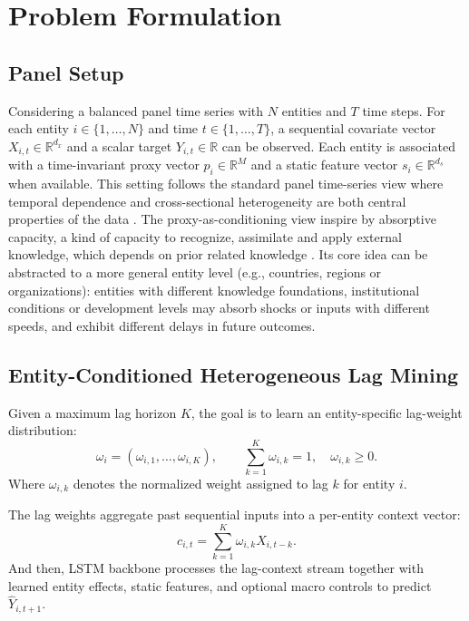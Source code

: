 \documentclass[conference]{IEEEtran}
\begin{document}
\section{Problem Formulation}\label{sec:problem_formulation}
\subsection{Panel Setup}
Considering a balanced panel time series with $N$ entities and $T$ time steps. For each entity $i \in \{1,\ldots,N\}$ and time $t \in \{1,\ldots,T\}$, a sequential covariate vector $X_{i,t}\in\mathbb{R}^{d_x}$ and a scalar target $Y_{i,t}\in\mathbb{R}$ can be observed. Each entity is associated with a time-invariant proxy vector $p_i\in\mathbb{R}^{M}$ and a static feature vector $s_i\in\mathbb{R}^{d_s}$ when available. This setting follows the standard panel time-series view where temporal dependence and cross-sectional heterogeneity are both central properties of the data \cite{thayasivam2025panelsurvey}. The proxy-as-conditioning view inspire by absorptive capacity, a kind of capacity to recognize, assimilate and apply external knowledge, which depends on prior related knowledge \cite{cohen1990absorptive}. Its core idea can be abstracted to a more general entity level (e.g., countries, regions or organizations): entities with different knowledge foundations, institutional conditions or development levels may absorb shocks or inputs with different speeds, and exhibit different delays in future outcomes.


\subsection{Entity-Conditioned Heterogeneous Lag Mining}
Given a maximum lag horizon $K$, the goal is to learn an entity-specific lag-weight distribution:
\[
    \omega_i = (\omega_{i,1}, \ldots, \omega_{i,K}),
    \qquad
    \sum_{k=1}^{K}\omega_{i,k}=1,\quad \omega_{i,k}\ge 0.
\]
Where $\omega_{i,k}$ denotes the normalized weight assigned to lag $k$ for entity $i$.

The lag weights aggregate past sequential inputs into a per-entity context vector:
\begin{equation}
    c_{i,t} = \sum_{k=1}^{K}\omega_{i,k}X_{i,t-k}.
\end{equation}
And then, LSTM backbone processes the lag-context stream together with learned entity effects, static features, and optional macro controls to predict $\widehat{Y}_{i,t+1}$.
\end{document}
